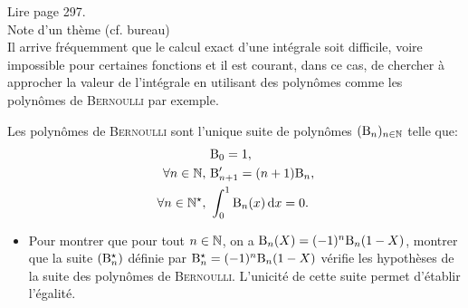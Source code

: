 Lire \cite{calcul_infinitesimal} page 297. \\
Note d'un thème (cf. bureau) \\

Il arrive fréquemment que le calcul exact d’une intégrale soit difficile, voire
impossible pour certaines fonctions et il est courant, dans ce cas, de chercher à
approcher la valeur de l’intégrale en utilisant des polynômes comme les polynômes de \textsc{Bernoulli} par exemple.

\begin{defi}
    Les polynômes de \textsc{Bernoulli} sont l'unique suite de polynômes $(\mathrm{B}_n)_{n \in \mathbb{N}}$ telle que:
    \begin{align*}
        &\mathrm{B}_0 = 1, \\
        \forall n \in \mathbb{N},\ &\mathrm{B}'_{n+1} = (n+1)\mathrm{B}_n, \\
        \forall n \in \mathbb{N}^\star,\ &\int_{0}^{1} \mathrm{B}_n(x) \, \mathrm{d} x = 0.
    \end{align*}
\end{defi}

\begin{itemize}
    \item Pour montrer que pour tout $n \in \mathbb{N}$, on a $\mathrm{B}_n(X)=(-1)^n \mathrm{B}_n(1-X)$, montrer que la suite $(\mathrm{B}_n^{\star})$ définie par $\mathrm{B}_n^{\star} = (-1)^n \mathrm{B}_n(1-X)$ vérifie les hypothèses de la suite des polynômes de \textsc{Bernoulli}. L'unicité de cette suite permet d'établir l'égalité. 
\end{itemize}